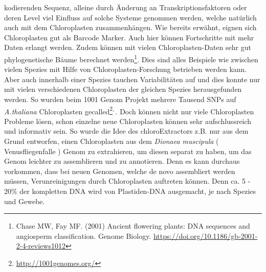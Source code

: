 \documentclass{scrartcl}
\begin{document}
kodierenden Sequenz, alleine durch Änderung an Transkriptionsfaktoren oder deren Level viel Einfluss auf solche Systeme genommen werden, welche natürlich auch mit dem Chloroplasten zusammenhängen\footnotemark[41]{}. Wie bereits erwähnt, 
eignen sich Chloroplasten gut als Barcode Marker. Auch hier können Fortschritte mit mehr Daten erlangt werden. Zudem können mit vielen Chloroplasten-Daten sehr gut phylogenetische Bäume berechnet werden\footnote{Chase MW, Fay MF. (2001) Ancient flowering plants: DNA sequences and angiosperm classification. Genome Biology. \url{https://doi.org/10.1186/gb-2001-2-4-reviews1012}}.
Dies sind alles Beispiele wie zwischen vielen Spezies mit Hilfe von Chloroplasten-Forschung betrieben werden kann. Aber auch innerhalb einer Spezies tauchen Variabilitäten auf und dies konnte nur mit vielen verschiedenen
Chloroplasten der gleichen Spezies herausgefunden werden. So wurden beim 1001 Genom Projekt mehrere Tausend SNPs auf \emph{A.thaliana} Chloroplasten gecalled\footnote{\url{http://1001genomes.org/}}\textsuperscript{,}\,\footnotemark[7]{}. 
Doch können nicht nur viele Chloroplasten Probleme lösen, schon einzelne neue Chloroplasten können sehr aufschlussreich und informativ sein. So wurde die Idee des chloroExtractors z.B. nur aus dem Grund
entworfen, einen Chloroplasten aus dem \emph{Dionaea muscipula} ( Venusfliegenfalle ) Genom zu extrahieren, um diesen separat zu haben, um das Genom leichter zu assemblieren und zu annotieren. Denn es kann durchaus vorkommen,
dass bei neuen Genomen, welche de novo assembliert werden müssen, Verunreinigungen durch Chloroplasten auftreten können. Denn ca. 5 - 20\% der kompletten DNA wird von Plastiden-DNA ausgemacht, je nach Spezies und Gewebe\footnotemark[41]{}.
\end{document}
